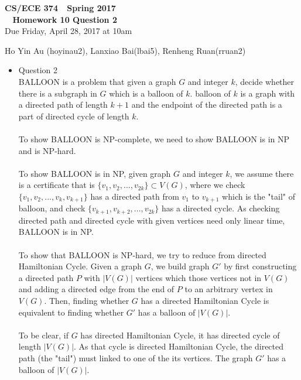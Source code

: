\documentclass[11pt]{article}
\begin{document}
\begin{center}
\Large\textbf{CS/ECE 374 \,\decosix\,  Spring 2017}%
\\
\LARGE\textbf{\decothreeleft~ Homework 10 Question 2 ~\decothreeright}%
\\[0.5ex]
\large Due Friday, April 28, 2017 at 10am
\end{center}

\begin{center}


\begin{Large}
Ho Yin Au (hoyinau2), Lanxiao Bai(lbai5), Renheng Ruan(rruan2)
\end{Large}
\end{center}

\begin{itemize}
	\item	Question 2\\
	BALLOON is a problem that given a graph $G$ and integer $k$, decide whether there is a subgraph in $G$ which is a balloon of $k$. balloon of $k$ is a graph with a directed path of length $k+1$ and the endpoint of the directed path is a part of directed cycle of length $k$.\\ \\ 
	To show BALLOON is NP-complete, we need to show BALLOON is in NP and is NP-hard.\\ \\ 
	To show BALLOON is in NP, given graph $G$ and integer $k$, we assume there is a certificate that is $\{ v_1, v_2, ... , v_{2k} \} \subset V(G)$, where we check $\{ v_1, v_2, ... , v_k, v_{k+1} \}$ has a directed path from $v_1$ to $v_{k+1}$ which is the "tail" of balloon, and check $\{ v_{k+1}, v_{k+2}, ... , v_{2k} \}$ has a directed cycle. As checking directed path and directed cycle with given vertices need only linear time, BALLOON is in NP.\\ \\ 
	To show that BALLOON is NP-hard, we try to reduce from directed Hamiltonian Cycle. Given a graph $G$, we build graph $G'$ by first constructing a directed path $P$ with $|V(G)|$ vertices which those vertices not in $V(G)$ and adding a directed edge from the end of $P$ to an arbitrary vertex in $V(G)$. Then, finding whether $G$ has a directed Hamiltonian Cycle is equivalent to finding whether $G'$ has a balloon of $|V(G)|$.\\ \\ 
	To be clear, if $G$ has directed Hamiltonian Cycle, it has directed cycle of length $|V(G)|$. As that cycle is directed Hamiltonian Cycle, the directed path (the "tail") must linked to one of the its vertices. The graph $G'$ has a balloon of $|V(G)|$.\\ \\ 

\end{itemize}
\end{document}

